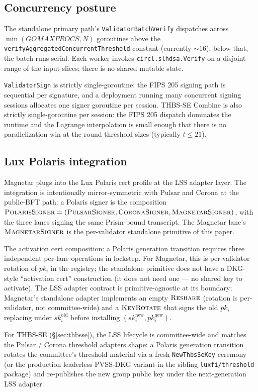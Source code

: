 \subsection{Concurrency posture}
\label{sec:impl:concurrency}

The standalone primary path's
\texttt{ValidatorBatchVerify} dispatches across
$\min(\mathit{GOMAXPROCS}, N)$ goroutines above the
\texttt{verifyAggregatedConcurrentThreshold} constant (currently
$\sim 16$); below that, the batch runs serial. Each worker
invokes \texttt{circl.slhdsa.Verify} on a disjoint range of the
input slices; there is no shared mutable state.

\texttt{ValidatorSign} is strictly single-goroutine: the FIPS 205
signing path is sequential per signature, and a deployment running
many concurrent signing sessions allocates one signer goroutine per
session. THBS-SE Combine is also strictly single-goroutine per
session: the FIPS 205 dispatch dominates the runtime and the
Lagrange interpolation is small enough that there is no
parallelization win at the round threshold sizes (typically
$t \le 21$).

\subsection{Lux Polaris integration}
\label{sec:impl:polaris}

Magnetar plugs into the Lux Polaris cert profile at the LSS
\cite{luxlssmpc} adapter layer. The integration is intentionally
mirror-symmetric with Pulsar and Corona at the public-BFT path: a
Polaris signer is the composition $\textsc{PolarisSigner} =
(\textsc{PulsarSigner}, \textsc{CoronaSigner},
\textsc{MagnetarSigner})$, with the three lanes signing the same
Prism-bound transcript. The Magnetar lane's
$\textsc{MagnetarSigner}$ is the per-validator standalone primitive
of this paper.

The activation cert composition: a Polaris generation transition
requires three independent per-lane operations in lockstep.
For Magnetar, this is per-validator rotation of $pk_i$ in the
registry; the standalone primitive does not have a DKG-style
``activation cert'' construction (it does not need one --- no
shared key to activate). The LSS adapter contract
\cite{luxlssmpc} is primitive-agnostic at its boundary; Magnetar's
standalone adapter implements an empty $\textsc{Reshare}$
(rotation is per-validator, not committee-wide) and a
$\textsc{KeyRotate}$ that signs the old $pk_i$ replacing under
$sk_i^{\mathrm{old}}$ before installing $(sk_i^{\mathrm{new}},
pk_i^{\mathrm{new}})$.

For THBS-SE (\S\ref{sec:thbsse}), the LSS lifecycle is
committee-wide and matches the Pulsar / Corona threshold adapters
shape: a Polaris generation transition rotates the committee's
threshold material via a fresh \texttt{NewThbsSeKey} ceremony (or
the production leaderless PVSS-DKG variant in the sibling
\texttt{luxfi/threshold} package) and re-publishes the new group
public key under the next-generation LSS adapter.
